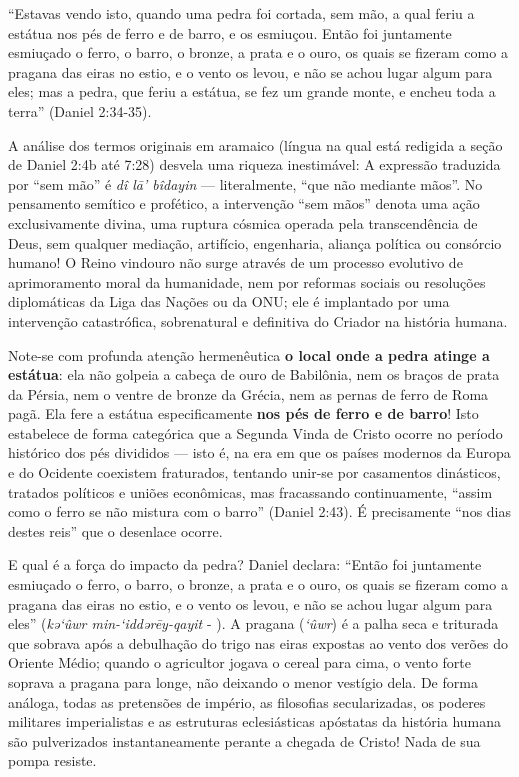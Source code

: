 \documentclass[11pt,a4paper,openany]{book}
\begin{document}
``Estavas vendo isto, quando uma pedra foi cortada, sem mão, a qual feriu a estátua nos pés de ferro e de barro, e os esmiuçou. Então foi juntamente esmiuçado o ferro, o barro, o bronze, a prata e o ouro, os quais se fizeram como a pragana das eiras no estio, e o vento os levou, e não se achou lugar algum para eles; mas a pedra, que feriu a estátua, se fez um grande monte, e encheu toda a terra'' (Daniel 2:34-35).

A análise dos termos originais em aramaico (língua na qual está redigida a seção de Daniel 2:4b até 7:28) desvela uma riqueza inestimável:
A expressão traduzida por ``sem mão'' é \textit{dî lā’ bîdayin} — literalmente, ``que não mediante mãos''. No pensamento semítico e profético, a intervenção ``sem mãos'' denota uma ação exclusivamente divina, uma ruptura cósmica operada pela transcendência de Deus, sem qualquer mediação, artifício, engenharia, aliança política ou consórcio humano! O Reino vindouro não surge através de um processo evolutivo de aprimoramento moral da humanidade, nem por reformas sociais ou resoluções diplomáticas da Liga das Nações ou da ONU; ele é implantado por uma intervenção catastrófica, sobrenatural e definitiva do Criador na história humana.

Note-se com profunda atenção hermenêutica \textbf{o local onde a pedra atinge a estátua}: ela não golpeia a cabeça de ouro de Babilônia, nem os braços de prata da Pérsia, nem o ventre de bronze da Grécia, nem as pernas de ferro de Roma pagã. Ela fere a estátua especificamente \textbf{nos pés de ferro e de barro}! Isto estabelece de forma categórica que a Segunda Vinda de Cristo ocorre no período histórico dos pés divididos — isto é, na era em que os países modernos da Europa e do Ocidente coexistem fraturados, tentando unir-se por casamentos dinásticos, tratados políticos e uniões econômicas, mas fracassando continuamente, ``assim como o ferro se não mistura com o barro'' (Daniel 2:43). É precisamente ``nos dias destes reis'' que o desenlace ocorre.

E qual é a força do impacto da pedra? Daniel declara:
``Então foi juntamente esmiuçado o ferro, o barro, o bronze, a prata e o ouro, os quais se fizeram como a pragana das eiras no estio, e o vento os levou, e não se achou lugar algum para eles'' (\textit{kə‘ûwr min-‘iddərēy-qayit} - ).
A pragana (\textit{‘ûwr}) é a palha seca e triturada que sobrava após a debulhação do trigo nas eiras expostas ao vento dos verões do Oriente Médio; quando o agricultor jogava o cereal para cima, o vento forte soprava a pragana para longe, não deixando o menor vestígio dela. De forma análoga, todas as pretensões de império, as filosofias secularizadas, os poderes militares imperialistas e as estruturas eclesiásticas apóstatas da história humana são pulverizados instantaneamente perante a chegada de Cristo! Nada de sua pompa resiste.
\end{document}
